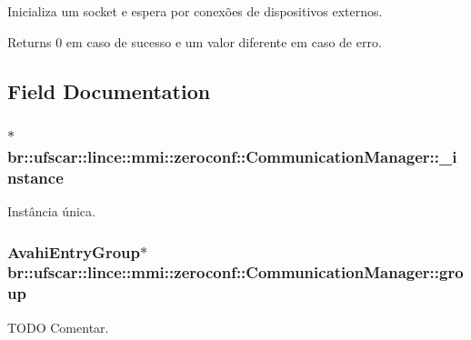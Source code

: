 Inicializa um socket e espera por conexões de dispositivos externos. 

\begin{DoxyReturn}{Returns}
0 em caso de sucesso e um valor diferente em caso de erro. 
\end{DoxyReturn}


\subsection{Field Documentation}
\hypertarget{classbr_1_1ufscar_1_1lince_1_1mmi_1_1zeroconf_1_1CommunicationManager_a661f79b7946162c5954531547e41c619}{
\subsubsection[{\_\-instance}]{$\ast$ {\bf br::ufscar::lince::mmi::zeroconf::CommunicationManager::\_\-instance}}}
\label{classbr_1_1ufscar_1_1lince_1_1mmi_1_1zeroconf_1_1CommunicationManager_a661f79b7946162c5954531547e41c619}


Instância única. 

\hypertarget{classbr_1_1ufscar_1_1lince_1_1mmi_1_1zeroconf_1_1CommunicationManager_a45a446d4698e5e9de6faa0f7c36e5af7}{
\subsubsection[{group}]{\setlength{\rightskip}{0pt plus 5cm}AvahiEntryGroup$\ast$ {\bf br::ufscar::lince::mmi::zeroconf::CommunicationManager::group}}}
\label{classbr_1_1ufscar_1_1lince_1_1mmi_1_1zeroconf_1_1CommunicationManager_a45a446d4698e5e9de6faa0f7c36e5af7}


TODO Comentar. 

